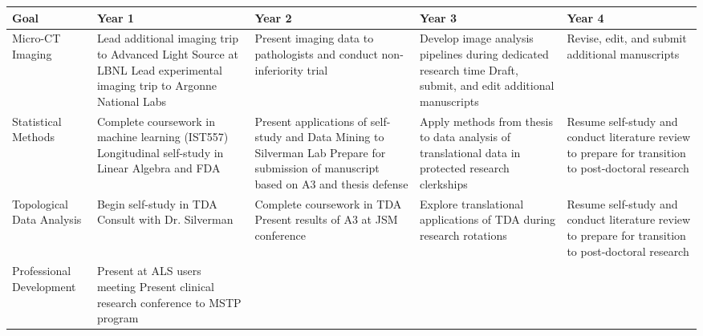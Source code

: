 \documentclass{NIHGrant}
\begin{document}
\begin{table}[h]
\centering
\scriptsize
\begin{tabularx}{\textwidth}{|l|>{\centering\arraybackslash}X|>{\centering\arraybackslash}X|>{\centering\arraybackslash}X|>{\centering\arraybackslash}X|}
  \hline
    \textbf{Goal} & \textbf{Year 1} & \textbf{Year 2} & \textbf{Year 3} & \textbf{Year 4} \\
    \hline
    Micro-CT Imaging &
    Lead additional imaging trip to Advanced Light Source at LBNL \newline
    Lead experimental imaging trip to Argonne National Labs &
    Present imaging data to pathologists and conduct non-inferiority trial &
    Develop image analysis pipelines during dedicated research time \newline
    Draft, submit, and edit additional manuscripts &
    Revise, edit, and submit additional manuscripts \\
    \hline
    Statistical Methods &
    Complete coursework in machine learning (IST557) \newline
    Longitudinal self-study in Linear Algebra and FDA &
    Present applications of self-study and Data Mining to Silverman Lab \newline
    Prepare for submission of manuscript based on A3 and thesis defense &
                                                                          Apply methods from thesis to data analysis of translational data in protected research clerkships &
                                                                                                                                                                              Resume self-study and conduct literature review to prepare for transition to post-doctoral research \\
    \hline
    Topological Data Analysis &
    Begin self-study in TDA \newline
    Consult with Dr. Silverman &
    Complete coursework in TDA \newline
    Present results of A3 at JSM conference &
                                              Explore translational applications of TDA during research rotations &
                                                                                                                  Resume self-study and conduct literature review to prepare for transition to post-doctoral research \\
\hline
    Professional Development &
    Present at ALS users meeting
    Present clinical research conference to MSTP program &

\end{tabularx}
\end{table}
\end{document}
